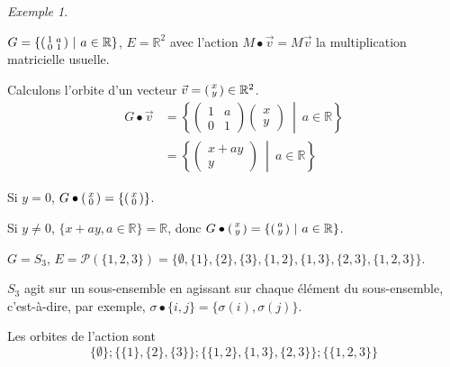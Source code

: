 \documentclass{report}
\newcommand*{\reels}{\mathbb{R}}
\theoremstyle{definition}
\theoremstyle{remark}
\newtheorem*{exem}{Exemple}
\begin{document}
	\begin{exem}~

		\begin{nlist}
			\item $G = \left\{\begin{psmallmatrix}
				1&a\\0&1
			\end{psmallmatrix} ~\middle|~ a \in \reels\right\}$, $E = \reels^2$ avec l'action $M \bullet \vec{v} = M\vec{v}$ la multiplication matricielle usuelle.

			Calculons l'orbite d'un vecteur $\vec{v} = \begin{psmallmatrix}
				x\\y
			\end{psmallmatrix} \in \reels^2$.
			\begin{align*}
				G \bullet \vec{v}&= \left\{\begin{pmatrix}
					1&a\\0&1
				\end{pmatrix} \begin{pmatrix}
					x\\y
				\end{pmatrix} ~\middle|~ a \in \reels\right\}\\
				&= \left\{\begin{pmatrix}
					x+ay\\y
				\end{pmatrix} ~\middle|~ a \in \reels\right\}
			\end{align*}

			Si $y=0$, $G \bullet \begin{psmallmatrix}
				x\\0
			\end{psmallmatrix} = \left\{\begin{psmallmatrix}
				x\\0
			\end{psmallmatrix}\right\}$.

			Si $y \neq 0$, $\{x+ay, a \in \reels\} = \reels$, donc $G \bullet \begin{psmallmatrix}
				x\\y
			\end{psmallmatrix} = \left\{\begin{psmallmatrix}
				a\\y
			\end{psmallmatrix} ~\middle|~ a \in \reels\right\}$.
			\item $G = S_3$, $E = \mathcal{P}(\{1,2,3\}) = \{\emptyset, \{1\}, \{2\}, \{3\}, \{1,2\}, \{1,3\}, \{2,3\}, \{1,2,3\}\}$.

			$S_3$ agit sur un sous-ensemble en agissant sur chaque \'el\'ement du sous-ensemble, c'est-\`a-dire, par exemple, $\sigma \bullet \{i,j\} = \{\sigma(i), \sigma(j)\}$.

			Les orbites de l'action sont
			\begin{equation*}
					\{\emptyset\}; \{\{1\}, \{2\}, \{3\}\}; \{\{1,2\}, \{1,3\}, \{2,3\}\}; \{\{1,2,3\}\}
			\end{equation*}
		\end{nlist}
	\end{exem}
\end{document}
